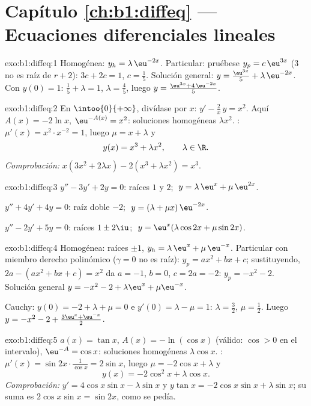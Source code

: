 \section*{Capítulo \ref{ch:b1:diffeq} --- Ecuaciones diferenciales lineales}

\begin{solution}{exo:b1:diffeq:1}
Homogénea: $y_h = \lambda\,\eu^{-2x}$. Particular: pruébese
$y_p = c\,\eu^{3x}$ ($3$ no es raíz de $r + 2$): $3c + 2c = 1$,
$c = \frac15$. Solución general: $y = \frac{\eu^{3x}}{5} +
\lambda\,\eu^{-2x}$. Con $y(0) = 1$: $\frac15 + \lambda = 1$,
$\lambda = \frac45$, luego $y = \frac{\eu^{3x} + 4\,\eu^{-2x}}{5}$.
\end{solution}

\begin{solution}{exo:b1:diffeq:2}
En $\intoo{0}{+\infty}$, divídase por $x$: $y' - \frac{2}{x}\,y = x^2$.
Aquí $A(x) = -2\ln x$, $\eu^{-A(x)} = x^2$: soluciones homogéneas
$\lambda x^2$. : $\mu'(x) = x^2 \cdot x^{-2} =
1$, luego $\mu = x + \lambda$ y
\[
y(x) = x^3 + \lambda x^2, \qquad \lambda \in \R .
\]
\emph{Comprobación:} $x(3x^2 + 2\lambda x) - 2(x^3 + \lambda x^2) = x^3$.
\end{solution}

\begin{solution}{exo:b1:diffeq:3}
$y'' - 3y' + 2y = 0$: raíces $1$ y $2$; $\;y = \lambda\,\eu^{x} +
\mu\,\eu^{2x}$.

$y'' + 4y' + 4y = 0$: raíz doble $-2$; $\;y = (\lambda + \mu
x)\,\eu^{-2x}$.

$y'' - 2y' + 5y = 0$: raíces $1 \pm 2\iu$; $\;y = \eu^{x}(\lambda\cos
2x + \mu\sin 2x)$.
\end{solution}

\begin{solution}{exo:b1:diffeq:4}
Homogénea: raíces $\pm 1$, $y_h = \lambda\,\eu^x + \mu\,\eu^{-x}$.
Particular con miembro derecho polinómico ($\gamma = 0$ no es raíz):
$y_p = ax^2 + bx + c$; sustituyendo, $2a - (ax^2 + bx + c) = x^2$ da
$a = -1$, $b = 0$, $c = 2a = -2$: $y_p = -x^2 - 2$. Solución general
$y = -x^2 - 2 + \lambda\eu^x + \mu\eu^{-x}$.

Cauchy: $y(0) = -2 + \lambda + \mu = 0$ e $y'(0) = \lambda - \mu = 1$:
$\lambda = \frac32$, $\mu = \frac12$. Luego
$y = -x^2 - 2 + \frac{3\eu^x + \eu^{-x}}{2}$.
\end{solution}

\begin{solution}{exo:b1:diffeq:5}
$a(x) = \tan x$, $A(x) = -\ln(\cos x)$ (válido: $\cos > 0$ en el
intervalo), $\eu^{-A} = \cos x$: soluciones homogéneas $\lambda\cos x$.
: $\mu'(x) = \sin 2x \cdot \frac{1}{\cos x} =
2\sin x$, luego $\mu = -2\cos x + \lambda$ y
\[
y(x) = -2\cos^2 x + \lambda \cos x .
\]
\emph{Comprobación:} $y' = 4\cos x \sin x - \lambda\sin x$ y
$y\tan x = -2\cos x\sin x + \lambda \sin x$; su suma es
$2\cos x\sin x = \sin 2x$, como se pedía.
\end{solution}

